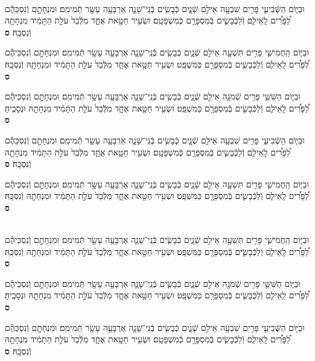 \documentclass[twoside, openany, parskip=half, 11pt]{book}
\begin{document}
\begin{footnotesize}
\begin{multicols}{2}
\\
וּבַיּ֧וֹם הַשְּֿׁבִיעִ֛י פָּרִ֥ים שִׁבְעָ֖ה אֵילִ֣ם שְֿׁנָ֑יִם כְּֿבָשִׂ֧ים בְּֿנֵֽי־שָׁנָ֛ה אַרְבָּעָ֥ה עָשָׂ֖ר תְּֿמִימִֽם׃ וּמִנְחָתָ֣ם וְֿנִסְכֵּהֶ֡ם לַ֠פָּרִ֠ים לָֽאֵילִ֧ם וְֿלַכְּֿבָשִׂ֛ים בְּֿמִסְפָּרָ֖ם כְּֿמִשְׁפָּטָֽם׃ וּשְׂעִ֥יר חַטָּ֖את אֶחָ֑ד מִלְּֿבַד֙ עֹלַ֣ת הַתָּמִ֔יד מִנְחָתָ֖הּ וְֿנִסְכָּֽהּ׃ \textbf{ס}

וּבַיּ֧וֹם הַֽחֲמִישִׁ֛י פָּרִ֥ים תִּשְׁעָ֖ה אֵילִ֣ם שְֿׁנָ֑יִם כְּֿבָשִׂ֧ים בְּֿנֵֽי־שָׁנָ֛ה אַרְבָּעָ֥ה עָשָׂ֖ר תְּֿמִימִֽם׃ וּמִנְחָתָ֣ם וְֿנִסְכֵּיהֶ֡ם לַ֠פָּרִ֠ים לָֽאֵילִ֧ם וְֿלַכְּֿבָשִׂ֛ים בְּֿמִסְפָּרָ֖ם כַּמִּשְׁפָּֽט׃ וּשְׂעִ֥יר חַטָּ֖את אֶחָ֑ד מִלְּֿבַד֙ עֹלַ֣ת הַתָּמִ֔יד וּמִנְחָתָ֖הּ וְֿנִסְכָּֽהּ׃ \textbf{ס}

וּבַיּ֧וֹם הַשִּׁשִּׁ֛י פָּרִ֥ים שְֿׁמֹנָ֖ה אֵילִ֣ם שְֿׁנָ֑יִם כְּֿבָשִׂ֧ים בְּֿנֵֽי־שָׁנָ֛ה אַרְבָּעָ֥ה עָשָׂ֖ר תְּֿמִימִֽם׃ וּמִנְחָתָ֣ם וְֿנִסְכֵּיהֶ֡ם לַ֠פָּרִ֠ים לָֽאֵילִ֧ם וְֿלַכְּֿבָשִׂ֛ים בְּֿמִסְפָּרָ֖ם כַּמִּשְׁפָּֽט׃ וּשְׂעִ֥יר חַטָּ֖את אֶחָ֑ד מִלְּֿבַד֙ עֹלַ֣ת הַתָּמִ֔יד מִנְחָתָ֖הּ וּנְסָכֶֽיהָ׃ \textbf{ס}\

וּבַיּ֧וֹם הַשְּֿׁבִיעִ֛י פָּרִ֥ים שִׁבְעָ֖ה אֵילִ֣ם שְֿׁנָ֑יִם כְּֿבָשִׂ֧ים בְּֿנֵֽי־שָׁנָ֛ה אַרְבָּעָ֥ה עָשָׂ֖ר תְּֿמִימִֽם׃ וּמִנְחָתָ֣ם וְֿנִסְכֵּהֶ֡ם לַ֠פָּרִ֠ים לָֽאֵילִ֧ם וְֿלַכְּֿבָשִׂ֛ים בְּֿמִסְפָּרָ֖ם כְּֿמִשְׁפָּטָֽם׃ וּשְׂעִ֥יר חַטָּ֖את אֶחָ֑ד מִלְּֿבַד֙ עֹלַ֣ת הַתָּמִ֔יד מִנְחָתָ֖הּ וְֿנִסְכָּֽהּ׃ \textbf{ס}

וּבַיּ֧וֹם הַֽחֲמִישִׁ֛י פָּרִ֥ים תִּשְׁעָ֖ה אֵילִ֣ם שְֿׁנָ֑יִם כְּֿבָשִׂ֧ים בְּֿנֵֽי־שָׁנָ֛ה אַרְבָּעָ֥ה עָשָׂ֖ר תְּֿמִימִֽם׃ וּמִנְחָתָ֣ם וְֿנִסְכֵּיהֶ֡ם לַ֠פָּרִ֠ים לָֽאֵילִ֧ם וְֿלַכְּֿבָשִׂ֛ים בְּֿמִסְפָּרָ֖ם כַּמִּשְׁפָּֽט׃ וּשְׂעִ֥יר חַטָּ֖את אֶחָ֑ד מִלְּֿבַד֙ עֹלַ֣ת הַתָּמִ֔יד וּמִנְחָתָ֖הּ וְֿנִסְכָּֽהּ׃ \textbf{ס}

\\
וּבַיּ֧וֹם הַֽחֲמִישִׁ֛י פָּרִ֥ים תִּשְׁעָ֖ה אֵילִ֣ם שְֿׁנָ֑יִם כְּֿבָשִׂ֧ים בְּֿנֵֽי־שָׁנָ֛ה אַרְבָּעָ֥ה עָשָׂ֖ר תְּֿמִימִֽם׃ וּמִנְחָתָ֣ם וְֿנִסְכֵּיהֶ֡ם לַ֠פָּרִ֠ים לָֽאֵילִ֧ם וְֿלַכְּֿבָשִׂ֛ים בְּֿמִסְפָּרָ֖ם כַּמִּשְׁפָּֽט׃ וּשְׂעִ֥יר חַטָּ֖את אֶחָ֑ד מִלְּֿבַד֙ עֹלַ֣ת הַתָּמִ֔יד וּמִנְחָתָ֖הּ וְֿנִסְכָּֽהּ׃ \textbf{ס}

וּבַיּ֧וֹם הַשִּׁשִּׁ֛י פָּרִ֥ים שְֿׁמֹנָ֖ה אֵילִ֣ם שְֿׁנָ֑יִם כְּֿבָשִׂ֧ים בְּֿנֵֽי־שָׁנָ֛ה אַרְבָּעָ֥ה עָשָׂ֖ר תְּֿמִימִֽם׃ וּמִנְחָתָ֣ם וְֿנִסְכֵּיהֶ֡ם לַ֠פָּרִ֠ים לָֽאֵילִ֧ם וְֿלַכְּֿבָשִׂ֛ים בְּֿמִסְפָּרָ֖ם כַּמִּשְׁפָּֽט׃ וּשְׂעִ֥יר חַטָּ֖את אֶחָ֑ד מִלְּֿבַד֙ עֹלַ֣ת הַתָּמִ֔יד מִנְחָתָ֖הּ וּנְסָכֶֽיהָ׃ \textbf{ס}

וּבַיּ֧וֹם הַשְּֿׁבִיעִ֛י פָּרִ֥ים שִׁבְעָ֖ה אֵילִ֣ם שְֿׁנָ֑יִם כְּֿבָשִׂ֧ים בְּֿנֵֽי־שָׁנָ֛ה אַרְבָּעָ֥ה עָשָׂ֖ר תְּֿמִימִֽם׃ וּמִנְחָתָ֣ם וְֿנִסְכֵּהֶ֡ם לַ֠פָּרִ֠ים לָֽאֵילִ֧ם וְֿלַכְּֿבָשִׂ֛ים בְּֿמִסְפָּרָ֖ם כְּֿמִשְׁפָּטָֽם׃ וּשְׂעִ֥יר חַטָּ֖את אֶחָ֑ד מִלְּֿבַד֙ עֹלַ֣ת הַתָּמִ֔יד מִנְחָתָ֖הּ וְֿנִסְכָּֽהּ׃ \textbf{ס}


\end{multicols}
\end{footnotesize}
\end{document}
